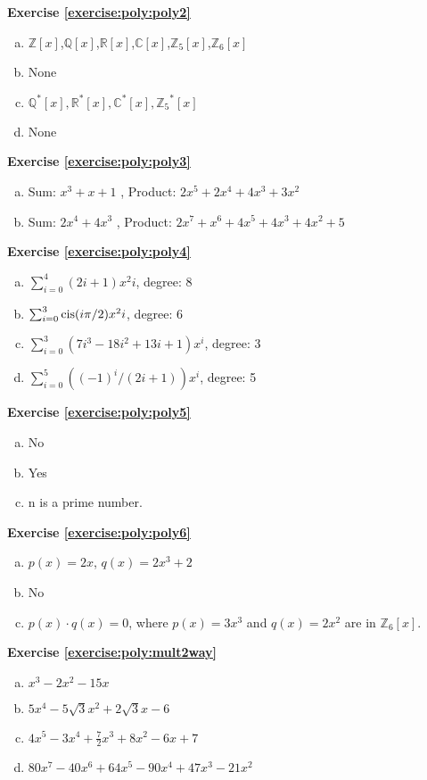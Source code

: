 \noindent\textbf{Exercise \ref{exercise:poly:poly2}}
\begin{enumerate} [(a)]
\item
 $\mathbb{Z}[x]$,$\mathbb{Q}[x]$,$\mathbb{R}[x]$,$\mathbb{C}[x]$,$\mathbb{Z}_5[x]$,$\mathbb{Z}_6[x]$
\item
 None
\item
 $\mathbb{Q}^*[x],\mathbb{R}^*[x], \mathbb{C}^*[x], {\mathbb{Z}_5}^*[x]$
\item
 None
\end {enumerate}

\noindent\textbf{Exercise \ref{exercise:poly:poly3}}
\begin{enumerate} [(a)]
\item
 Sum: $x^3+x+1$ , Product: $2x^5+2x^4+4x^3+3x^2$
\item
 Sum: $2x^4+4x^3$ , Product: $2x^7+x^6+4x^5+4x^3+4x^2+5$
\end {enumerate}

\noindent\textbf{Exercise \ref{exercise:poly:poly4}}
\begin{enumerate} [(a)]
\item
 $\sum_{i=0}^{4} (2i+1)x^2i$, degree: 8
\item
 $\sum_{i=0}^{3} \operatorname{cis}(i\pi/2)x^2i$, degree: 6
\item 
$\sum_{i=0}^{3} (7i^3-18i^2+13i+1)x^i$, degree: 3
\item
 $\sum_{i=0}^{5} ((-1)^i/(2i+1))x^i$, degree: 5
\end {enumerate}

\noindent\textbf{Exercise \ref{exercise:poly:poly5}}
\begin{enumerate} [(a)]
\item
 No
\item 
Yes
\item
 n is a prime number.
\end {enumerate}

\noindent\textbf{Exercise \ref{exercise:poly:poly6}}
\begin{enumerate} [(a)]
\item
 $p(x)=2x$, $q(x)=2x^3+2$
\item 
No
\item
 $p(x) \cdot q(x)=0$, where $p(x)=3x^3$ and $q(x)=2x^2$ are in $\mathbb{Z}_6[x]$.
\end {enumerate}

\noindent\textbf{Exercise \ref{exercise:poly:mult2way}}
\begin{enumerate} [(a)]
\item 
 $x^3-2x^2-15x$
\item
 $5x^4-5\sqrt{3}x^2+2\sqrt{3}x-6$
\item
$4x^5-3x^4+\frac{7}{2}x^3+8x^2-6x+7$
\item
$80x^7-40x^6+64x^5-90x^4+47x^3-21x^2$
\end {enumerate}


